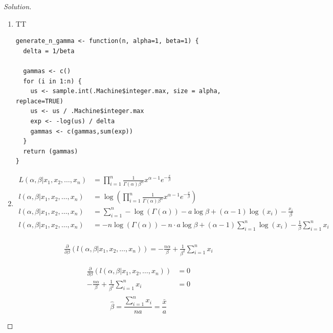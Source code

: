 \documentclass{article}
\newenvironment{solution}
  {\renewcommand\qedsymbol{$\blacksquare$}\begin{proof}[Solution]$ $}
  {\end{proof}}
\let \extra T
\begin{document}
\pagebreak
\begin{Exercise}
    \begin{solution}
        \begin{enumerate}[label=(\roman*)]
            \item
                  \ifx \extra T
                      \begin{verbatim}
generate_n_gamma <- function(n, alpha=1, beta=1) {
  delta = 1/beta
  
  gammas <- c() 
  for (i in 1:n) {
    us <- sample.int(.Machine$integer.max, size = alpha, replace=TRUE)
    us <- us / .Machine$integer.max
    exp <- -log(us) / delta
    gammas <- c(gammas,sum(exp))
  }
  return (gammas)
}
            \end{verbatim}
                  \fi
            \item
                  \begin{align*}
                      L(\alpha, \beta| x_1,x_2,\ldots,x_n) & = \prod_{i=1}^{n}\frac{1}{\Gamma(\alpha)\beta^{\alpha}}x^{\alpha-1}e^{-\frac{x}{\beta}}       \\
                      l(\alpha, \beta| x_1,x_2,\ldots,x_n) & = \log(\prod_{i=1}^{n}\frac{1}{\Gamma(\alpha)\beta^{\alpha}}x^{\alpha-1}e^{-\frac{x}{\beta}}) \\
                      l(\alpha, \beta| x_1,x_2,\ldots,x_n) & = \sum_{i=1}^{n}-\log(\Gamma(\alpha))-a\log\beta+(\alpha-1)\log(x_i)-\frac{x_i}{\beta}        \\
                      l(\alpha, \beta| x_1,x_2,\ldots,x_n) & = -n\log(\Gamma(\alpha))-n\cdot a\log\beta
                      +(\alpha-1)\sum_{i=1}^{n}\log(x_i)-\frac{1}{\beta}\sum_{i=1}^{n}x_i                                                                  \\
                  \end{align*}

                  \begin{align*}
                      \frac{\partial}{\partial \beta}(l(\alpha, \beta| x_1,x_2,\ldots,x_n))  = -\frac{n\alpha}{\beta}+\frac{1}{\beta^2} \sum_{i=1}^{n} x_i
                  \end{align*}

                  \begin{align*}
                      \frac{\partial}{\partial \beta}(l(\alpha, \beta| x_1,x_2,\ldots,x_n)) & = 0 \\
                      -\frac{n\alpha}{\beta}+\frac{1}{\beta^2} \sum_{i=1}^{n} x_i           & = 0 \\
                  \end{align*}
                  \[\hat \beta = \frac{\sum_{i=1}^{n}x_i}{na} = \frac{\bar x}{a}\]


\end{enumerate}
\end{solution}
\end{Exercise}
\end{document}
